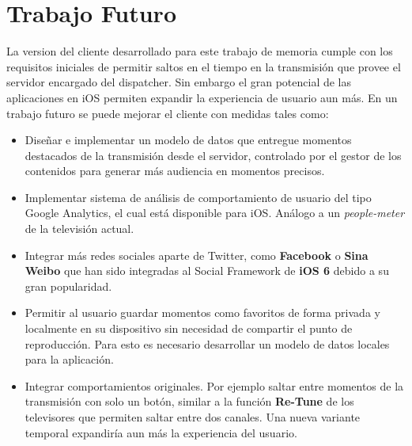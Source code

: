 	\section{Trabajo Futuro}
La version del cliente desarrollado para este trabajo de memoria cumple con los requisitos iniciales de permitir saltos en el tiempo en la transmisión que provee el servidor encargado del dispatcher. Sin embargo el gran potencial de las aplicaciones en iOS permiten expandir la experiencia de usuario aun más. En un trabajo futuro se puede mejorar el cliente con medidas tales como:
\begin{itemize}
\item Diseñar e implementar un modelo de datos que entregue momentos destacados de la transmisión desde el servidor, controlado por el gestor de los contenidos para generar más audiencia en momentos precisos.

\item Implementar sistema de análisis de comportamiento de usuario del tipo Google Analytics, el cual está disponible para iOS. Análogo a un \textit{people-meter} de la televisión actual.

\item Integrar más redes sociales aparte de Twitter, como \textbf{Facebook} o \textbf{Sina Weibo} que han sido integradas al Social Framework de \textbf{iOS 6} debido a su gran popularidad.

\item Permitir al usuario guardar momentos como favoritos de forma privada y localmente en su dispositivo sin necesidad de compartir el punto de reproducción. Para esto es necesario desarrollar un modelo de datos locales para la aplicación.

\item Integrar comportamientos originales. Por ejemplo saltar entre momentos de la transmisión con solo un botón, similar a la función \textbf{Re-Tune} de los televisores que permiten saltar entre dos canales. Una nueva variante temporal expandiría aun más la experiencia del usuario.
\end{itemize}

	

